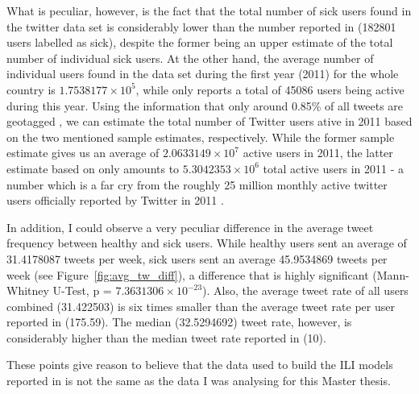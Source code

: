 \documentclass[11pt, a4paper]{article}\usepackage[]{graphicx}\usepackage[]{color}
\begin{document}
What is peculiar, however, is the fact that the total number of sick users found in the twitter data set is considerably lower than the number reported in \citep{bodnar_data_2015} (182801 users labelled as sick), despite the former being an upper estimate of the total number of individual sick users. At the other hand, the average number of individual users found in the data set during the first year (2011) for the whole country is \ensuremath{1.7538177\times 10^{5}}, while \citep{bodnar_data_2015} only reports a total of 45086 users being active during this year. Using the information that only around 0.85\% of all tweets are geotagged \citep{sloan_who_2015}, we can estimate the total number of Twitter users ative in 2011 based on the two mentioned sample estimates, respectively. While the former sample estimate gives us an average of \ensuremath{2.0633149\times 10^{7}} active users in 2011, the latter estimate based on \cite{bodnar_data_2015} only amounts to \ensuremath{5.3042353\times 10^{6}} total active users in 2011 - a number which is a far cry from the roughly 25 million monthly active twitter users officially reported by Twitter in 2011 \citep{twitter_twitter_2013_annual_report_2013}. \newline

In addition, I could observe a very peculiar difference in the average tweet frequency between healthy and sick users. While healthy users sent an average of 31.4178087 tweets per week, sick users sent an average 45.9534869 tweets per week (see Figure~\ref{fig:avg_tw_diff}), a difference that is highly significant (Mann-Whitney U-Test, p = \ensuremath{7.3631306\times 10^{-23}}). Also, the average tweet rate of all users combined (31.422503) is six times smaller than the average tweet rate per user reported in \citep{bodnar_data_2015} (175.59). The median (32.5294692) tweet rate, however, is considerably higher than the median tweet rate reported in \citep{bodnar_data_2015} (10).\newline

These points give reason to believe that the data used to build the ILI models reported in \citep{bodnar_data_2015} is not the same as the data I was analysing for this Master thesis.\newline
\end{document}

